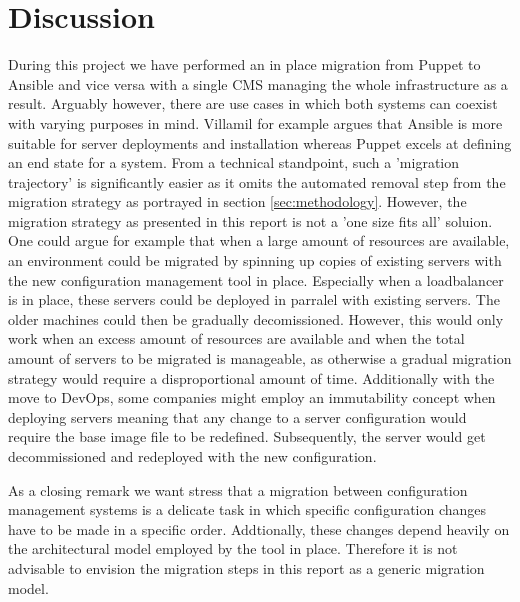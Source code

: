 \section{Discussion}\label{sec:discussion}
During this project we have performed an in place migration from Puppet to Ansible and vice versa with a single CMS managing the whole infrastructure as a result. Arguably however, there are use cases in which both systems can coexist with varying purposes in mind. Villamil \cite{villamil_2014} for example argues that Ansible is more suitable for server deployments and installation whereas Puppet excels at defining an end state for a system. From a technical standpoint, such a 'migration trajectory' is significantly easier as it omits the automated removal step from the migration strategy as portrayed in section \ref{sec:methodology}. However, the migration strategy as presented in this report is not a 'one size fits all' soluion. One could argue for example that when a large amount of resources are available, an environment could be migrated by spinning up copies of existing servers with the new configuration management tool in place. Especially when a loadbalancer is in place, these servers could be deployed in parralel with existing servers. The older machines could then be gradually decomissioned. However, this would only work when an excess amount of resources are available and when the total amount of servers to be migrated is manageable, as otherwise a gradual migration strategy would require a disproportional amount of time. Additionally with the move to DevOps, some companies might employ an immutability concept when deploying servers meaning that any change to a server configuration would require the base image file to be redefined. Subsequently, the server would get decommissioned and redeployed with the new configuration. 

As a closing remark we want stress that a migration between configuration management systems is a delicate task in which specific configuration changes have to be made in a specific order. Addtionally, these changes depend heavily on the architectural model employed by the tool in place. Therefore it is not advisable to envision the migration steps in this report as a generic migration model.
